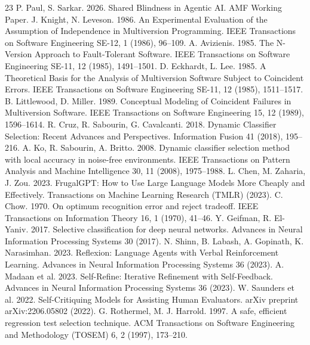 \documentclass[manuscript,screen,nonacm]{acmart}
\begin{document}
\begin{thebibliography}{23}
 P. Paul, S. Sarkar. 2026. Shared Blindness in Agentic AI. AMF Working Paper.
 J. Knight, N. Leveson. 1986. An Experimental Evaluation of the Assumption of Independence in Multiversion Programming. IEEE Transactions on Software Engineering SE-12, 1 (1986), 96--109.
 A. Avizienis. 1985. The N-Version Approach to Fault-Tolerant Software. IEEE Transactions on Software Engineering SE-11, 12 (1985), 1491--1501.
 D. Eckhardt, L. Lee. 1985. A Theoretical Basis for the Analysis of Multiversion Software Subject to Coincident Errors. IEEE Transactions on Software Engineering SE-11, 12 (1985), 1511--1517.
 B. Littlewood, D. Miller. 1989. Conceptual Modeling of Coincident Failures in Multiversion Software. IEEE Transactions on Software Engineering 15, 12 (1989), 1596--1614.
 R. Cruz, R. Sabourin, G. Cavalcanti. 2018. Dynamic Classifier Selection: Recent Advances and Perspectives. Information Fusion 41 (2018), 195--216.
 A. Ko, R. Sabourin, A. Britto. 2008. Dynamic classifier selection method with local accuracy in noise-free environments. IEEE Transactions on Pattern Analysis and Machine Intelligence 30, 11 (2008), 1975--1988.
 L. Chen, M. Zaharia, J. Zou. 2023. FrugalGPT: How to Use Large Language Models More Cheaply and Effectively. Transactions on Machine Learning Research (TMLR) (2023).
 C. Chow. 1970. On optimum recognition error and reject tradeoff. IEEE Transactions on Information Theory 16, 1 (1970), 41--46.
 Y. Geifman, R. El-Yaniv. 2017. Selective classification for deep neural networks. Advances in Neural Information Processing Systems 30 (2017).
 N. Shinn, B. Labash, A. Gopinath, K. Narasimhan. 2023. Reflexion: Language Agents with Verbal Reinforcement Learning. Advances in Neural Information Processing Systems 36 (2023).
 A. Madaan et al. 2023. Self-Refine: Iterative Refinement with Self-Feedback. Advances in Neural Information Processing Systems 36 (2023).
 W. Saunders et al. 2022. Self-Critiquing Models for Assisting Human Evaluators. arXiv preprint arXiv:2206.05802 (2022).
 G. Rothermel, M. J. Harrold. 1997. A safe, efficient regression test selection technique. ACM Transactions on Software Engineering and Methodology (TOSEM) 6, 2 (1997), 173--210.

\end{thebibliography}
\end{document}
